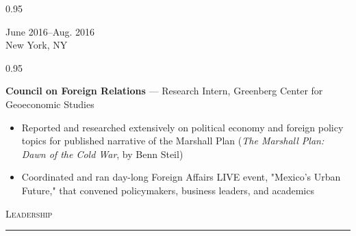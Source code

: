 \documentclass[a4paper,9pt]{article}
\newcommand{\mainMarginBottom}{\vspace*{2.5pt}}
\newcommand{\newLine}{\\}
\newcommand{\doubleColumnGap}{\hspace{4mm}}
\newcommand{\sectionMarginTopBottom}{\vspace*{9pt}}
\newcommand{\sectionMarginBetweenRemove}{\vspace{-5ex}}
\newcommand{\sectionMarginBetweenAdd}{\vspace{20pt}}
\newcommand{\mainLineSpacing}{0.95}
\def\hrulefill{\leavevmode\leaders\hrule height 1.75pt\hfill\kern0pt}
\begin{document}
\begin{minipage}[t]{0.20\linewidth}
  \begin{small}
    \begin{spacing}\mainLineSpacing{}
      \begin{flushright}
        June 2016--Aug. 2016
        \newLine{}
        \mainMarginBottom{}
        New York, NY
      \end{flushright}
    \end{spacing}
  \end{small}
\end{minipage}
\doubleColumnGap{}
\begin{minipage}[t]{0.75\linewidth}
  \begin{small}
    \begin{spacing}\mainLineSpacing{}
      \begin{flushleft}
        \textbf{Council on Foreign Relations} --- Research Intern, Greenberg Center for Geoeconomic Studies
        \mainMarginBottom{}
        \begin{itemize}[itemsep=1pt,topsep=0pt,leftmargin=*]
          \item Reported and researched extensively on political economy and foreign policy topics for published narrative of the Marshall Plan (\textit{The Marshall Plan: Dawn of the Cold War}, by Benn Steil)
          \item Coordinated and ran day-long Foreign Affairs LIVE event, "Mexico's Urban Future," that convened policymakers, business leaders, and academics
        \end{itemize}
      \end{flushleft}
    \end{spacing}
  \end{small}
\end{minipage}

\sectionMarginBetweenRemove{}
\sectionMarginBetweenAdd{}

\hspace*{11pt}\textsc{\fontsize{20}{24}\selectfont Leadership}\hspace*{14pt}\hrulefill
\sectionMarginTopBottom{}
\end{document}
